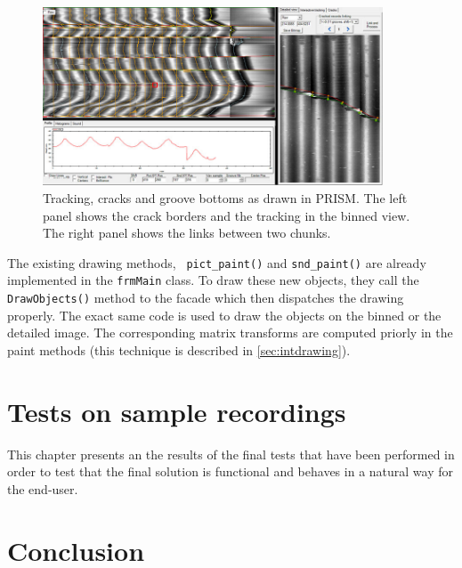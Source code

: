 \begin{figure}[!ht]
\centering
\includegraphics[width=0.9\textwidth]{images/prism-draw-ex}
\caption[Tracking, cracks and groove bottoms as drawn in PRISM.]
{Tracking, cracks and groove bottoms as drawn in PRISM. The left panel shows the crack borders and the tracking in the binned view. The right panel shows the links between two chunks.}
\label{fig:prismdrawex}
\end{figure}

The existing drawing methods, \texttt{ pict\_paint()} and \texttt{snd\_paint()} are already implemented in the \texttt{frmMain} class. To draw these new objects, they call the \texttt{DrawObjects()} method to the facade which then dispatches the drawing properly. The exact same code is used to draw the objects on the binned or the detailed image. The corresponding matrix transforms are computed priorly in the paint methods (this technique is described in \autoref{sec:intdrawing}).


\chapter{Tests on sample recordings}
\label{chap:tests}

This chapter presents an the results of the final tests that have been performed in order to test that the final solution is functional and behaves in a natural way for the end-user.


\chapter{Conclusion}
\label{chap:conclusion}

